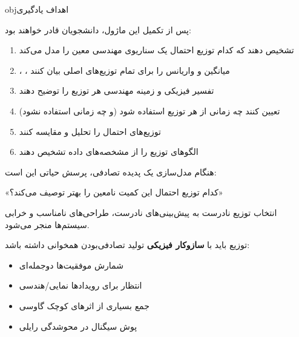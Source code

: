 \begin{PSbox}[unbreakable]{obj}{اهداف یادگیری}

پس از تکمیل این ماژول، دانشجویان قادر خواهند بود:

\begin{enumerate}
\def\labelenumi{\arabic{enumi}.}
\tightlist
\item
  تشخیص دهند که کدام توزیع احتمال یک سناریوی مهندسی معین را مدل می‌کند
\item
  ، ، میانگین و واریانس را برای تمام توزیع‌های اصلی بیان کنند
\item
  تفسیر فیزیکی و زمینه مهندسی هر توزیع را توضیح دهند
\item
  تعیین کنند چه زمانی از هر توزیع استفاده شود (و چه زمانی استفاده نشود)
\item
  توزیع‌های احتمال را تحلیل و مقایسه کنند
\item
  الگوهای توزیع را از مشخصه‌های داده تشخیص دهند
\end{enumerate}

\end{PSbox}



هنگام مدل‌سازی یک پدیده تصادفی، پرسش حیاتی این است:

\begin{PSquote}

«کدام توزیع احتمال این کمیت نامعین را بهتر توصیف می‌کند؟»

\end{PSquote}

انتخاب توزیع نادرست به پیش‌بینی‌های نادرست، طراحی‌های نامناسب و خرابی سیستم‌ها منجر می‌شود.


توزیع باید با \textbf{سازوکار فیزیکی} تولید تصادفی‌بودن همخوانی داشته باشد:

\begin{itemize}
\tightlist
\item
  شمارش موفقیت‌ها \lr{\mbox{\ensuremath{\to}}} دوجمله‌ای
\item
  انتظار برای رویدادها \lr{\mbox{\ensuremath{\to}}} نمایی/هندسی
\item
  جمع بسیاری از اثرهای کوچک \lr{\mbox{\ensuremath{\to}}} گاوسی
\item
  پوش سیگنال در محوشدگی \lr{\mbox{\ensuremath{\to}}} رایلی
\end{itemize}

